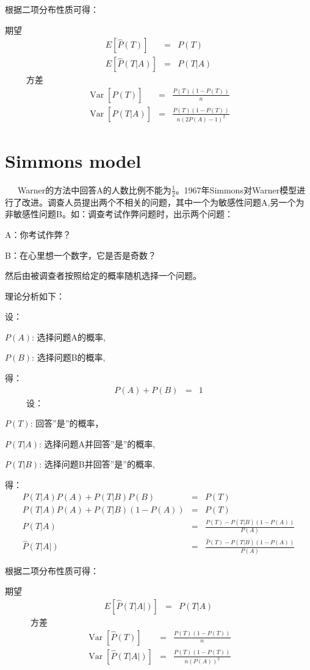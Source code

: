 \documentclass{article}
\newcommand{\tmop}[1]{\ensuremath{\operatorname{#1}}}
\begin{document}
\begin{CJK*}{UTF8}{gbsn}
根据二项分布性质可得：

期望
\begin{eqnarray*}
  E [\hat{P} (T)] & = & P (T)\\
  E [\hat{P} (T|A)] & = & P (T|A)
\end{eqnarray*}
\ \ \ \ \ 方差
\begin{eqnarray*}
  \tmop{Var} [\hat{P} (T)] & = & \frac{P (T) (1 - P (T))}{n}\\
  \tmop{Var} [\hat{P} (T|A)] & = & \frac{P (T) (1 - P (T))}{n (2 P (A) - 1)^2}
\end{eqnarray*}

\section{Simmons model}

\ \ \
Warner的方法中回答A的人数比例不能为$\frac{1}{2}$。1967年Simmons对Warner模型进行了改进。调查人员提出两个不相关的问题，其中一个为敏感性问题A,另一个为非敏感性问题B。如：调查考试作弊问题时，出示两个问题：

A：你考试作弊？

B：在心里想一个数字，它是否是奇数？

然后由被调查者按照给定的概率随机选择一个问题。

理论分析如下：

设：

$P (A)$: 选择问题A的概率,

$P (B)$: 选择问题B的概率,

得：
\begin{eqnarray*}
  P (A) + P (B) & = & 1
\end{eqnarray*}
\ \ \ \ \ 设：

$P (T)$: 回答''是''的概率，

$P (T|A)$: 选择问题A并回答''是''的概率,

$P (T|B)$: 选择问题B并回答''是''的概率,

得：
\begin{eqnarray*}
  P (T|A) P (A) + P (T|B) P (B) & = & P (T)\\
  P (T|A) P (A) + P (T|B) (1 - P (A)) & = & P (T)\\
  P (T|A) & = & \frac{P (T) - P (T|B) (1 - P (A))}{P (A)}\\
  \hat{P} (T | A |) & = & \frac{\hat{P} (T) - P (T|B) (1 - P (A))}{P (A)}
\end{eqnarray*}


根据二项分布性质可得：

期望
\begin{eqnarray*}
  E [\hat{P} (T | A |)] & = & P (T|A)
\end{eqnarray*}
\ \ \ \ \ \ 方差
\begin{eqnarray*}
  \tmop{Var} [\hat{P} (T)] & = & \frac{P (T) (1 - P (T))}{n}\\
  \tmop{Var} [\hat{P} (T | A |)] & = & \frac{P (T) (1 - P (T))}{n (P (A))^2}
\end{eqnarray*}

\end{CJK*}
\end{document}
